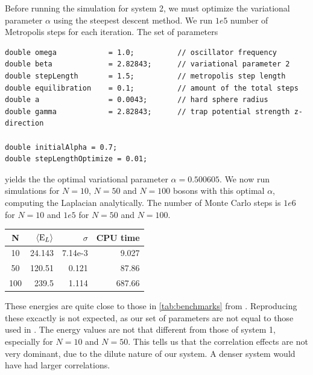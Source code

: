 \documentclass[english, a4paper]{article}
\begin{document}
Before running the simulation for system 2, we must optimize the variational parameter $\alpha$ using
the steepest descent method. We run $1e5$ number of Metropolis steps for each iteration.
The set of parameters
\belowcaptionskip=-10pt
\begin{lstlisting}[label=parameters3,caption=Parameters system 2]
double omega            = 1.0;          // oscillator frequency
double beta             = 2.82843;      // variational parameter 2
double stepLength       = 1.5;          // metropolis step length
double equilibration    = 0.1;          // amount of the total steps
double a                = 0.0043;       // hard sphere radius
double gamma            = 2.82843;      // trap potential strength z-direction

double initialAlpha = 0.7;
double stepLengthOptimize = 0.01;
\end{lstlisting}
yields the the optimal variational parameter $\alpha = 0.500605$. 
We now run simulations for $N=10$, $N=50$ and $N=100$ bosons with this optimal $\alpha$, computing
the Laplacian analytically. 
The number of Monte Carlo steps is $1e6$ for $N=10$ and $1e5$ for $N=50$ and $N=100$.
\begin{table}[H]
  \centering
  \begin{tabular}{ | c | r | r | r | }
    \hline
    N& $\langle {\textrm E_L}\rangle$& $\sigma$& CPU time \\*
    \hline
    10& 24.143& 7.14e-3& 9.027 \\*
    \hline
    50& 120.51& 0.121& 87.86  \\*
    \hline
    100& 239.5& 1.114& 687.66\\*
    \hline
  \end{tabular}
  \label{tab:Tabell1}
\end{table}
These energies are quite close to those in \ref{tab:benchmarks} from \cite{ref1}. 
Reproducing these excactly is not expected, as our set of parameters are not equal to those used in \cite{ref1}. 
The energy values are not that different from those of system 1, especially for $N=10$ and $N=50$. 
This tells us that the correlation effects are not very dominant, due to the dilute nature of our system. 
A denser system would have had larger correlations. 
\end{document}
